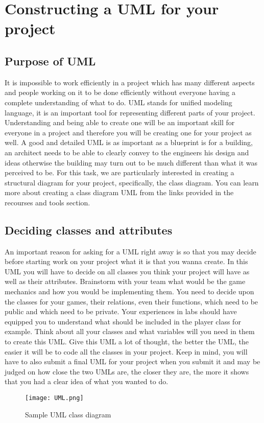 \documentclass[11pt,fleqn]{book} %
\begin{document}
\chapter{Constructing a UML for your project} %
	\section{Purpose of UML}
    It is impossible to work efficiently in a project which has many different aspects and people working on it to be done efficiently without everyone having a complete understanding of what to do. UML stands for unified modeling language, it is an important tool for representing different parts of your project. Understanding and being able to create one will be an important skill for everyone in a project and therefore you will be creating one for your project as well. A good and detailed UML is as important as a blueprint is for a building, an architect needs to be able to clearly convey to the engineers his design and ideas otherwise the building may turn out to be much different than what it was perceived to be. For this task, we are particularly interested in creating a structural diagram for your project, specifically, the class diagram. You can learn more about creating a class diagram UML from the links provided in the recourses and tools section.
    \section{Deciding classes and attributes}
    An important reason for asking for a UML right away is so that you may decide before starting work on your project what it is that you wanna create. In this UML you will have to decide on all classes you think your project will have as well as their attributes. Brainstorm with your team what would be the game mechanics and how you would be implementing them. You need to decide upon the classes for your games, their relations, even their functions, which need to be public and which need to be private. Your experiences in labs should have equipped you to understand what should be included in the player class for example. Think about all your classes and what variables will you need in them to create this UML. Give this UML a lot of thought, the better the UML, the easier it will be to code all the classes in your project. Keep in mind, you will have to also submit a final UML for your project when you submit it and may be judged on how close the two UMLs are, the closer they are, the more it shows that you had a clear idea of what you wanted to do.
    \begin{figure}[ht]
            \centering
            \texttt{[image: UML.png]}
            \caption{Sample UML class diagram}
            \label{fig:my_label}
        \end{figure}
        
\end{document}
